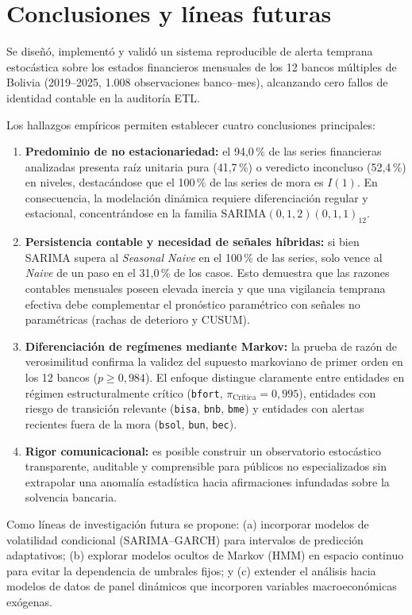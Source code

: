 \documentclass[11pt,letterpaper]{article}
\begin{document}
\section{Conclusiones y líneas futuras}

Se diseñó, implementó y validó un sistema reproducible de alerta temprana estocástica sobre los estados financieros mensuales de los 12 bancos múltiples de Bolivia (2019--2025, 1.008 observaciones banco--mes), alcanzando cero fallos de identidad contable en la auditoría ETL.

Los hallazgos empíricos permiten establecer cuatro conclusiones principales:
\begin{enumerate}[leftmargin=1.5em]
  \item \textbf{Predominio de no estacionariedad:} el 94{,}0\,\% de las series financieras analizadas presenta raíz unitaria pura (41{,}7\,\%) o veredicto inconcluso (52{,}4\,\%) en niveles, destacándose que el 100\,\% de las series de mora es \(I(1)\). En consecuencia, la modelación dinámica requiere diferenciación regular y estacional, concentrándose en la familia \(\text{SARIMA}(0,1,2)(0,1,1)_{12}\).
  \item \textbf{Persistencia contable y necesidad de señales híbridas:} si bien SARIMA supera al \emph{Seasonal Naive} en el 100\,\% de las series, solo vence al \emph{Naive} de un paso en el 31{,}0\,\% de los casos. Esto demuestra que las razones contables mensuales poseen elevada inercia y que una vigilancia temprana efectiva debe complementar el pronóstico paramétrico con señales no paramétricas (rachas de deterioro y CUSUM).
  \item \textbf{Diferenciación de regímenes mediante Markov:} la prueba de razón de verosimilitud confirma la validez del supuesto markoviano de primer orden en los 12 bancos (\(p \ge 0{,}984\)). El enfoque distingue claramente entre entidades en régimen estructuralmente crítico (\texttt{bfort}, \(\pi_{\text{Crítica}} = 0{,}995\)), entidades con riesgo de transición relevante (\texttt{bisa}, \texttt{bnb}, \texttt{bme}) y entidades con alertas recientes fuera de la mora (\texttt{bsol}, \texttt{bun}, \texttt{bec}).
  \item \textbf{Rigor comunicacional:} es posible construir un observatorio estocástico transparente, auditable y comprensible para públicos no especializados sin extrapolar una anomalía estadística hacia afirmaciones infundadas sobre la solvencia bancaria.
\end{enumerate}

Como líneas de investigación futura se propone: (a) incorporar modelos de volatilidad condicional (SARIMA--GARCH) para intervalos de predicción adaptativos; (b) explorar modelos ocultos de Markov (HMM) en espacio continuo para evitar la dependencia de umbrales fijos; y (c) extender el análisis hacia modelos de datos de panel dinámicos que incorporen variables macroeconómicas exógenas.
\end{document}
